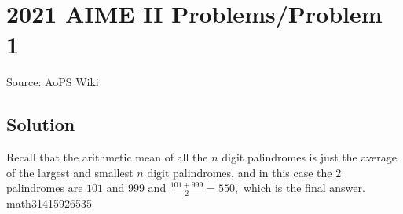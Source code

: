 \documentclass[12pt]{article}
\begin{document}
\section*{{2021 AIME II Problems/Problem 1}}
Source: AoPS Wiki

\subsection*{Solution}
Recall that the arithmetic mean of all the $n$ digit palindromes is just the average of the largest and smallest $n$ digit palindromes, and in this case the $2$ palindromes are $101$ and $999$ and $\frac{101+999}{2}=\boxed{550},$ which is the final answer. ~ math31415926535
\end{document}
